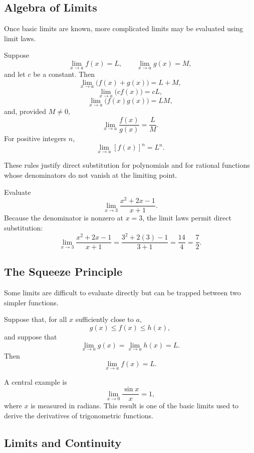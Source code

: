 \subsection{Algebra of Limits}

Once basic limits are known, more complicated limits may be evaluated using limit laws.

\begin{bookproperty}
Suppose
\[
\lim_{x\to a}f(x)=L,
\qquad
\lim_{x\to a}g(x)=M,
\]
and let \(c\) be a constant. Then
\[
\lim_{x\to a}\bigl(f(x)+g(x)\bigr)=L+M,
\]
\[
\lim_{x\to a}\bigl(cf(x)\bigr)=cL,
\]
\[
\lim_{x\to a}\bigl(f(x)g(x)\bigr)=LM,
\]
and, provided \(M\neq0\),
\[
\lim_{x\to a}\frac{f(x)}{g(x)}=\frac{L}{M}.
\]
For positive integers \(n\),
\[
\lim_{x\to a}[f(x)]^n=L^n.
\]
\end{bookproperty}

These rules justify direct substitution for polynomials and for rational functions whose denominators do not vanish at the limiting point.

\begin{bookexample}
Evaluate
\[
\lim_{x\to3}\frac{x^2+2x-1}{x+1}.
\]
Because the denominator is nonzero at \(x=3\), the limit laws permit direct substitution:
\[
\lim_{x\to3}\frac{x^2+2x-1}{x+1}
=
\frac{3^2+2(3)-1}{3+1}
=
\frac{14}{4}
=
\frac{7}{2}.
\]
\end{bookexample}

\subsection{The Squeeze Principle}

Some limits are difficult to evaluate directly but can be trapped between two simpler functions.

\begin{bookprinciple}
Suppose that, for all \(x\) sufficiently close to \(a\),
\[
g(x)\leq f(x)\leq h(x),
\]
and suppose that
\[
\lim_{x\to a}g(x)
=
\lim_{x\to a}h(x)
=L.
\]
Then
\[
\lim_{x\to a}f(x)=L.
\]
\end{bookprinciple}

A central example is
\[
\boxed{
\lim_{x\to0}\frac{\sin x}{x}=1,
}
\]
where \(x\) is measured in radians. This result is one of the basic limits used to derive the derivatives of trigonometric functions.

\subsection{Limits and Continuity}

